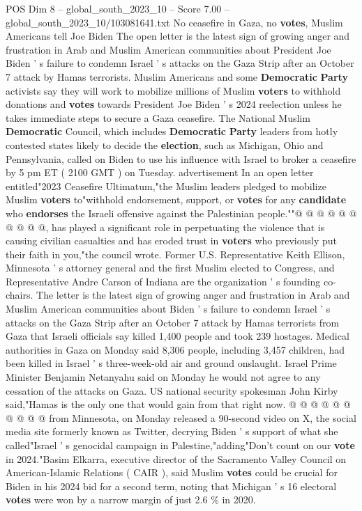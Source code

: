 \begin{textsample}{POS Dim 8 – global\_south\_2023\_10 – Score 7.00 – global\_south\_2023\_10/103081641.txt}  \label{ex:f8_pos_359}
No ceasefire in Gaza, no \textbf{votes}, Muslim Americans tell Joe Biden The open letter is the latest sign of growing anger and frustration in Arab and Muslim American communities about President Joe Biden ' s failure to condemn Israel ' s attacks on the Gaza Strip after an October 7 attack by Hamas terrorists.
Muslim Americans and some \textbf{Democratic} \textbf{Party} activists say they will work to mobilize millions of Muslim \textbf{voters} to withhold donations and \textbf{votes} towards President Joe Biden ' s 2024 reelection unless he takes immediate steps to secure a Gaza ceasefire.
The National Muslim \textbf{Democratic} Council, which includes \textbf{Democratic} \textbf{Party} leaders from hotly contested states likely to decide the \textbf{election}, such as Michigan, Ohio and Pennsylvania, called on Biden to use his influence with Israel to broker a ceasefire by 5 pm ET ( 2100 GMT ) on Tuesday. advertisement In an open letter entitled"2023 Ceasefire Ultimatum,"the Muslim leaders pledged to mobilize Muslim \textbf{voters} to"withhold endorsement, support, or \textbf{votes} for any \textbf{candidate} who \textbf{endorses} the Israeli offensive against the Palestinian people.""@ @ @ @ @ @ @ @ @ @, has played a significant role in perpetuating the violence that is causing civilian casualties and has eroded trust in \textbf{voters} who previously put their faith in you,"the council wrote.
Former U.S.
Representative Keith Ellison, Minnesota ' s attorney general and the first Muslim elected to Congress, and Representative Andre Carson of Indiana are the organization ' s founding co-chairs.
The letter is the latest sign of growing anger and frustration in Arab and Muslim American communities about Biden ' s failure to condemn Israel ' s attacks on the Gaza Strip after an October 7 attack by Hamas terrorists from Gaza that Israeli officials say killed 1,400 people and took 239 hostages.
Medical authorities in Gaza on Monday said 8,306 people, including 3,457 children, had been killed in Israel ' s three-week-old air and ground onslaught.
Israel Prime Minister Benjamin Netanyahu said on Monday he would not agree to any cessation of the attacks on Gaza.
US national security spokesman John Kirby said,"Hamas is the only one that would gain from that right now. @ @ @ @ @ @ @ @ @ @ from Minnesota, on Monday released a 90-second video on X, the social media site formerly known as Twitter, decrying Biden ' s support of what she called"Israel ' s genocidal campaign in Palestine,"adding"Don't count on our \textbf{vote} in 2024."Basim Elkarra, executive director of the Sacramento Valley Council on American-Islamic Relations ( CAIR ), said Muslim \textbf{votes} could be crucial for Biden in his 2024 bid for a second term, noting that Michigan ' s 16 electoral \textbf{votes} were won by a narrow margin of just 2.6 \% in 2020.

\end{textsample}
